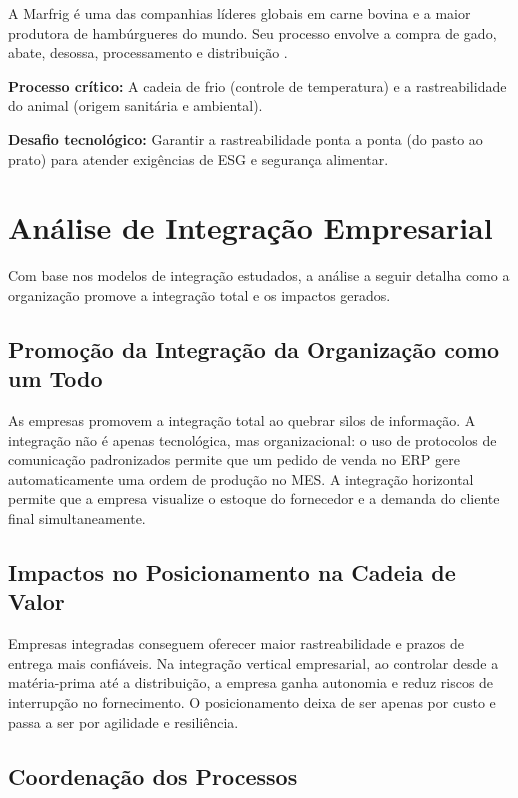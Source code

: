 \documentclass[12pt,a4paper,oneside]{article}
\begin{document}
A Marfrig é uma das companhias líderes globais em carne bovina e a maior produtora de hambúrgueres do mundo. Seu processo envolve a compra de gado, abate, desossa, processamento e distribuição \cite{marfrig2026}.

\textbf{Processo crítico:} A cadeia de frio (controle de temperatura) e a rastreabilidade do animal (origem sanitária e ambiental).

\textbf{Desafio tecnológico:} Garantir a rastreabilidade ponta a ponta (do pasto ao prato) para atender exigências de ESG e segurança alimentar.

\section{Análise de Integração Empresarial}

Com base nos modelos de integração estudados, a análise a seguir detalha como a organização promove a integração total e os impactos gerados.

\subsection{Promoção da Integração da Organização como um Todo}

As empresas promovem a integração total ao quebrar silos de informação. A integração não é apenas tecnológica, mas organizacional: o uso de protocolos de comunicação padronizados permite que um pedido de venda no ERP gere automaticamente uma ordem de produção no MES. A integração horizontal permite que a empresa visualize o estoque do fornecedor e a demanda do cliente final simultaneamente.

\subsection{Impactos no Posicionamento na Cadeia de Valor}

Empresas integradas conseguem oferecer maior rastreabilidade e prazos de entrega mais confiáveis. Na integração vertical empresarial, ao controlar desde a matéria-prima até a distribuição, a empresa ganha autonomia e reduz riscos de interrupção no fornecimento. O posicionamento deixa de ser apenas por custo e passa a ser por agilidade e resiliência.

\subsection{Coordenação dos Processos}
\end{document}
